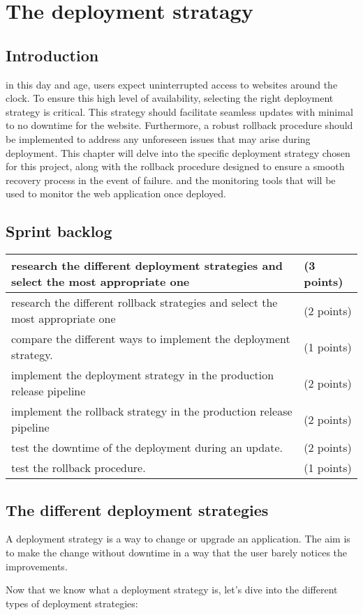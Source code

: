 \chapter{The deployment stratagy}
\section{Introduction}
in this day and age, users expect uninterrupted access to websites around the clock.  To ensure this high level of availability, selecting the right deployment strategy is critical.  This strategy should facilitate seamless updates with minimal to no downtime for the website.  Furthermore, a robust rollback procedure should be implemented to address any unforeseen issues that may arise during deployment.  This chapter will delve into the specific deployment strategy chosen for this project, along with the rollback procedure designed to ensure a smooth recovery process in the event of failure. and the monitoring tools that will be used to monitor the web application once deployed.
\section{Sprint backlog}
\begin{longtable}[c]{
    |p{}|
    p{}|
    }
    \hline
    research the different deployment strategies and select the most appropriate one & (3 points) \\
    \hline
    research the different rollback strategies and select the most appropriate one   & (2 points) \\
    \hline
    compare the different ways to implement the deployment strategy.                 & (1 points) \\
    \hline
    implement the deployment strategy in the production release pipeline             & (2 points) \\
    \hline
    implement the rollback strategy in the production release pipeline               & (2 points) \\
    \hline
    test the downtime of the deployment during an update.                            & (2 points) \\
    \hline
    test the rollback procedure.                                                     & (1 points) \\ \hline
\end{longtable}
\section{The different deployment strategies \cite{webArticle6}}
A deployment strategy is a way to change or upgrade an application. The aim is to make the change without downtime in a way that the user barely notices the improvements.
\par Now that we know what a deployment strategy is, let's dive into the different types of deployment strategies:

